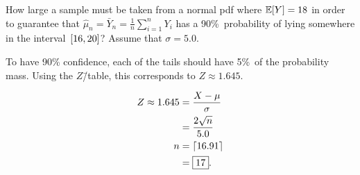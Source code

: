 \begin{problem}
   How large a sample must be taken from a normal pdf where ${\mathbb{E}\lbrack Y\rbrack = 18}$ in order to guarantee that ${\hat{\mu}_n = \bar{Y}_n = \frac{1}{n} \sum_{i=1}^{n} Y_i}$ has a 90\%~probability of lying somewhere in the interval~${\lbrack16,20\rbrack}$?  Assume that ${\sigma = 5.0}$.
\end{problem}

To have 90\% confidence, each of the tails should have 5\%~of the probability mass.  Using the $Z$\=/table, this corresponds to ${Z \approx 1.645}$.

\begin{align}
  Z \approx 1.645 &= \frac{X - \mu}{\sigma} \\
                  &= \frac{2\sqrt{n}}{5.0} \\
                n &= \lceil16.91\rceil \\
                  &= \boxed{17} \text{.}
\end{align}
